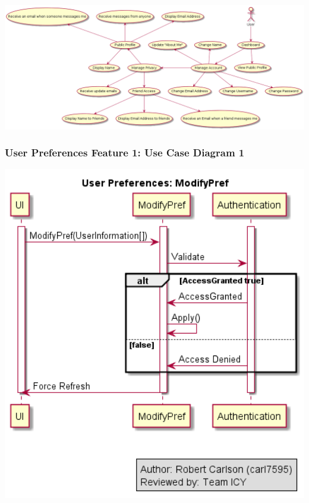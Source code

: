 \documentclass[twoside,letterpaper]{article}
\begin{document}
	\includegraphics[width=6.0in]{images/UseCaseDiagrams/UserPreferences}
	
	\newpage
	
	\subsubsection[User Preferences Feature 1: Use Case Diagram 1]{\rmfamily\bfseries\color{black}
		User Preferences Feature 1: Use Case Diagram 1}
	\hypertarget{RefHeading22059017292}{}
	\bigskip
	
	\includegraphics[width=6.0in]{images/SequenceDiagrams/UserPreferencesModifyPref.png}
	
	\newpage
	
\end{document}
